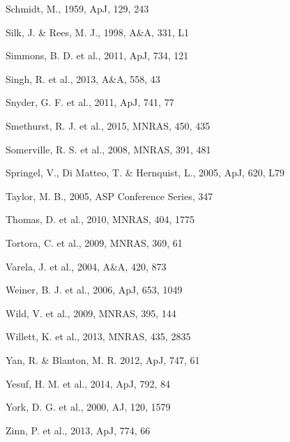 \documentclass[useAMS,usenatbib]{mn2e}
\begin{document}
\begin{thebibliography}{}
 Schmidt, M., 1959, ApJ, 129, 243

 Silk, J. \& Rees, M. J., 1998, A\&A, 331, L1

 Simmons, B. D. et al., 2011, ApJ, 734, 121

 Singh, R. et al., 2013, A\&A, 558, 43

 Snyder, G. F. et al., 2011, ApJ, 741, 77

 Smethurst, R. J. et al., 2015, MNRAS, 450, 435

 Somerville, R. S. et al., 2008, MNRAS, 391, 481

 Springel, V., Di Matteo, T. \& Hernquist, L., 2005, ApJ, 620, L79

 Taylor, M. B., 2005, ASP Conference Series, 347

 Thomas, D. et al., 2010, MNRAS, 404, 1775

 Tortora, C. et al., 2009, MNRAS, 369, 61

 Varela, J. et al., 2004, A\&A, 420, 873

 Weiner, B. J. et al., 2006, ApJ, 653, 1049

 Wild, V. et al., 2009, MNRAS, 395, 144

 Willett, K. et al., 2013, MNRAS, 435, 2835

 Yan, R. \& Blanton, M. R. 2012, ApJ, 747, 61

 Yesuf, H. M. et al., 2014, ApJ, 792, 84

 York, D. G. et al., 2000, AJ, 120, 1579

 Zinn, P. et al., 2013, ApJ, 774, 66

\end{thebibliography}{}
\end{document}
